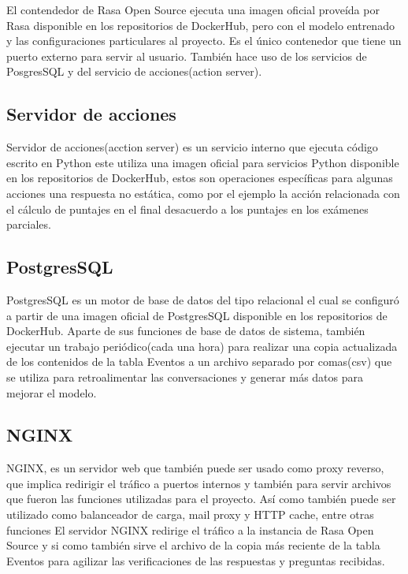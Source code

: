 El contendedor de Rasa Open Source ejecuta una imagen oficial proveída por Rasa disponible en los
repositorios de DockerHub\cite{DockerHub}, pero con el modelo entrenado y las configuraciones
particulares al proyecto. Es el único contenedor que tiene un puerto externo para servir al
usuario. También hace uso de los servicios de PosgresSQL y del servicio de acciones(action server).

\subsection{Servidor de acciones}

Servidor de acciones(acction server) es un servicio interno que ejecuta código escrito en Python
este utiliza una imagen oficial para servicios Python disponible en los repositorios de
DockerHub\cite{DockerHub}, estos son operaciones específicas para algunas acciones una respuesta no
estática, como por el ejemplo la acción relacionada con el cálculo de puntajes en el final
desacuerdo a los puntajes en los exámenes parciales.

\subsection{PostgresSQL}

PostgresSQL es un motor de base de datos del tipo relacional\cite{postgresql} el cual se configuró
a partir de una imagen oficial de PostgresSQL disponible en los repositorios de
DockerHub\cite{DockerHub}. Aparte de sus funciones de base de datos de sistema, también ejecutar un
trabajo periódico(cada una hora) para realizar una copia actualizada de los contenidos de la tabla
Eventos a un archivo separado por comas(csv) que se utiliza para retroalimentar las conversaciones
y generar más datos para mejorar el modelo.

\subsection{NGINX}

NGINX, es un servidor web que también puede ser usado como proxy reverso, que implica redirigir el
tráfico a puertos internos y también para servir archivos que fueron las funciones utilizadas para
el proyecto. Así como también puede ser utilizado como balanceador de carga, mail proxy y HTTP
cache, entre otras funciones \cite{NGINX}
El servidor NGINX redirige el tráfico a la instancia de Rasa Open Source y si como también sirve el
archivo de
la copia más reciente de la tabla Eventos para agilizar las verificaciones de las respuestas y
preguntas recibidas.

